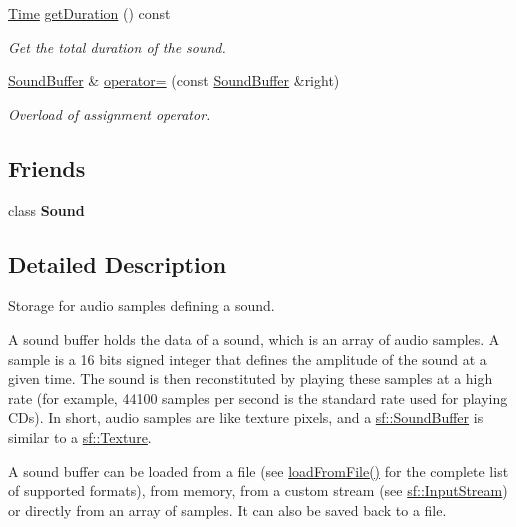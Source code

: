\begin{DoxyCompactItemize}
\hyperlink{classsf_1_1_time}{Time} \hyperlink{classsf_1_1_sound_buffer_a280a581d9b360fd16121714c51fc8261}{get\+Duration} () const
\begin{DoxyCompactList}\small\item\em Get the total duration of the sound. \end{DoxyCompactList}\item 
\hyperlink{classsf_1_1_sound_buffer}{Sound\+Buffer} \& \hyperlink{classsf_1_1_sound_buffer_adcc786b60bbd95be1551368fafd274a7}{operator=} (const \hyperlink{classsf_1_1_sound_buffer}{Sound\+Buffer} \&right)
\begin{DoxyCompactList}\small\item\em Overload of assignment operator. \end{DoxyCompactList}\end{DoxyCompactItemize}
\subsection*{Friends}
\begin{DoxyCompactItemize}
\item 
\mbox{\label{classsf_1_1_sound_buffer_a50914f77c7cf4fb97616c898c5291f4b}} 
class {\bfseries Sound}
\end{DoxyCompactItemize}


\subsection{Detailed Description}
Storage for audio samples defining a sound. 

A sound buffer holds the data of a sound, which is an array of audio samples. A sample is a 16 bits signed integer that defines the amplitude of the sound at a given time. The sound is then reconstituted by playing these samples at a high rate (for example, 44100 samples per second is the standard rate used for playing C\+Ds). In short, audio samples are like texture pixels, and a \hyperlink{classsf_1_1_sound_buffer}{sf\+::\+Sound\+Buffer} is similar to a \hyperlink{classsf_1_1_texture}{sf\+::\+Texture}.

A sound buffer can be loaded from a file (see \hyperlink{classsf_1_1_sound_buffer_a2be6a8025c97eb622a7dff6cf2594394}{load\+From\+File()} for the complete list of supported formats), from memory, from a custom stream (see \hyperlink{classsf_1_1_input_stream}{sf\+::\+Input\+Stream}) or directly from an array of samples. It can also be saved back to a file.

